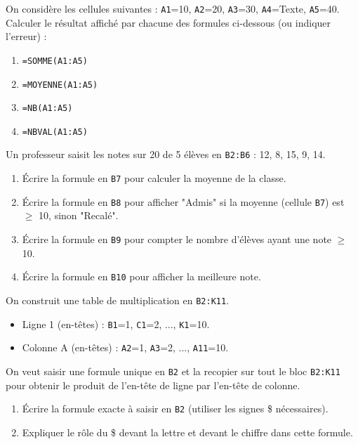 \documentclass[11pt]{article}
\newcounter{popsec}
\newcounter{popsub}
\newcommand{\courssub}[1]{%
  \stepcounter{popsub}%
  \par\vspace{9pt}\noindent{\popxbold\fontsize{11.5}{13}\selectfont\color{popink}{\color{poporange}\thepopsec.\thepopsub}\hspace{6pt}#1}\par\nopagebreak\vspace{4pt}
}
\begin{document}
\begin{exercice}
On considère les cellules suivantes :
\texttt{A1}=10, \texttt{A2}=20, \texttt{A3}=30, \texttt{A4}=Texte, \texttt{A5}=40.
Calculer le résultat affiché par chacune des formules ci-dessous (ou indiquer l'erreur) :
\begin{enumerate}
    \item \texttt{=SOMME(A1:A5)}
    \item \texttt{=MOYENNE(A1:A5)}
    \item \texttt{=NB(A1:A5)}
    \item \texttt{=NBVAL(A1:A5)}
\end{enumerate}
\end{exercice}

\courssub{Je m'entraîne}

\begin{exercice}
Un professeur saisit les notes sur 20 de 5 élèves en \texttt{B2:B6} : 12, 8, 15, 9, 14.
\begin{enumerate}
    \item Écrire la formule en \texttt{B7} pour calculer la moyenne de la classe.
    \item Écrire la formule en \texttt{B8} pour afficher "Admis" si la moyenne (cellule \texttt{B7}) est $\ge$ 10, sinon "Recalé".
    \item Écrire la formule en \texttt{B9} pour compter le nombre d'élèves ayant une note $\ge$ 10.
    \item Écrire la formule en \texttt{B10} pour afficher la meilleure note.
\end{enumerate}
\end{exercice}

\begin{exercice}
On construit une table de multiplication en \texttt{B2:K11}.
\begin{itemize}
    \item Ligne 1 (en-têtes) : \texttt{B1}=1, \texttt{C1}=2, ..., \texttt{K1}=10.
    \item Colonne A (en-têtes) : \texttt{A2}=1, \texttt{A3}=2, ..., \texttt{A11}=10.
\end{itemize}
On veut saisir une formule unique en \texttt{B2} et la recopier sur tout le bloc \texttt{B2:K11} pour obtenir le produit de l'en-tête de ligne par l'en-tête de colonne.
\begin{enumerate}
    \item Écrire la formule exacte à saisir en \texttt{B2} (utiliser les signes \$ nécessaires).
    \item Expliquer le rôle du \$ devant la lettre et devant le chiffre dans cette formule.
\end{enumerate}
\end{exercice}
\end{document}
